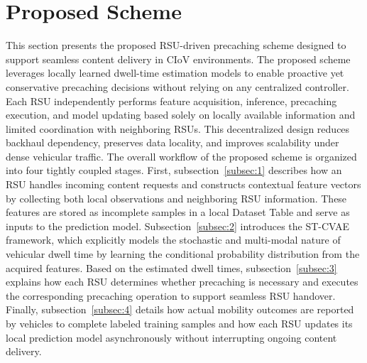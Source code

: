 \documentclass[journal]{IEEEtran}
\begin{document}
\section{Proposed Scheme} \label{sec.prop}
This section presents the proposed RSU-driven precaching scheme designed to support seamless content delivery in CIoV environments.
The proposed scheme leverages locally learned dwell-time estimation models to enable proactive yet conservative precaching decisions without relying on any centralized controller.
Each RSU independently performs feature acquisition, inference, precaching execution, and model updating based solely on locally available information and limited coordination with neighboring RSUs.
This decentralized design reduces backhaul dependency, preserves data locality, and improves scalability under dense vehicular traffic.
The overall workflow of the proposed scheme is organized into four tightly coupled stages.
First, subsection~\ref{subsec:1} describes how an RSU handles incoming content requests and constructs contextual feature vectors by collecting both local observations and neighboring RSU information.
These features are stored as incomplete samples in a local Dataset Table and serve as inputs to the prediction model.
Subsection~\ref{subsec:2} introduces the ST-CVAE framework, which explicitly models the stochastic and multi-modal nature of vehicular dwell time by learning the conditional probability distribution from the acquired features.
Based on the estimated dwell times, subsection~\ref{subsec:3} explains how each RSU determines whether precaching is necessary and executes the corresponding precaching operation to support seamless RSU handover.
Finally, subsection~\ref{subsec:4} details how actual mobility outcomes are reported by vehicles to complete labeled training samples and how each RSU updates its local prediction model asynchronously without interrupting ongoing content delivery.
\end{document}
